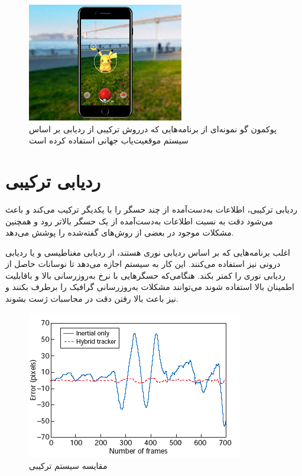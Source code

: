 \begin{figure}
	\centering
	\includegraphics[width=1\linewidth]{image/pokemongo}
	\caption {پوکمون گو نمونه‌ای از برنامه‌هایی که درروش ترکیبی از ردیابی بر اساس سیستم موقعیت‌یاب جهانی استفاده کرده است    \cite{pokemongo}}
	\label{fig:pokemongo}
\end{figure}

\section{ردیابی ترکیبی}
ردیابی ترکیبی، اطلاعات به‌دست‌آمده از چند حسگر را با یکدیگر ترکیب می‌کند و باعث می‌شود دقت به نسبت اطلاعات به‌دست‌آمده از یک حسگر بالاتر رود و همچنین مشکلات موجود در بعضی از روش‌های گفته‌شده را پوشش می‌دهد\cite{isham2018framework}.

اغلب برنامه‌هایی که بر اساس ردیابی نوری هستند، از ردیابی مغناطیسی و یا ردیابی درونی نیز استفاده می‌کنند. این کار به سیستم اجازه می‌دهد تا نوسانات حاصل از ردیابی نوری را کمتر بکند. هنگامی‌که حسگرهایی با نرخ به‌روزرسانی بالا و باقابلیت اطمینان بالا استفاده شوند می‌توانند مشکلات به‌روزرسانی گرافیک را برطرف بکنند و نیز باعث بالا رفتن دقت در محاسبات ژست بشوند.
\begin{figure}
	\centering
	\includegraphics[width=1\linewidth]{image/hybrid}
	\caption {مقایسه سیستم ترکیبی\cite{you1999orientation}}
	\label{fig:hybrid}
\end{figure}

